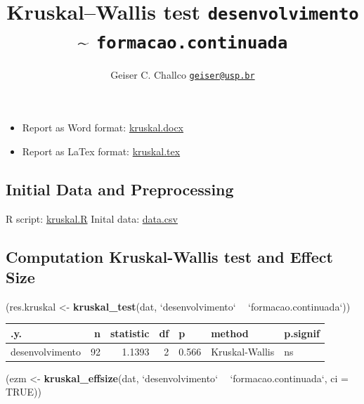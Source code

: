 \documentclass[]{article}
\title{Kruskal--Wallis test \texttt{desenvolvimento} \textasciitilde{}
\texttt{formacao.continuada}}
\author{Geiser C. Challco \href{mailto:geiser@usp.br}{\nolinkurl{geiser@usp.br}}}
\date{}
\newenvironment{Shaded}{\begin{snugshade}}{\end{snugshade}}
\newcommand{\DataTypeTok}[1]{\textcolor[rgb]{0.13,0.29,0.53}{#1}}
\newcommand{\KeywordTok}[1]{\textcolor[rgb]{0.13,0.29,0.53}{\textbf{#1}}}
\newcommand{\NormalTok}[1]{#1}
\newcommand{\OperatorTok}[1]{\textcolor[rgb]{0.81,0.36,0.00}{\textbf{#1}}}
\newcommand{\OtherTok}[1]{\textcolor[rgb]{0.56,0.35,0.01}{#1}}
\newcommand{\StringTok}[1]{\textcolor[rgb]{0.31,0.60,0.02}{#1}}
\providecommand{\tightlist}{%
  \setlength{\itemsep}{0pt}\setlength{\parskip}{0pt}}
\begin{document}
\maketitle

\begin{itemize}
\tightlist
\item
  Report as Word format: \url{kruskal.docx}
\item
  Report as LaTex format: \url{kruskal.tex}
\end{itemize}

\hypertarget{initial-data-and-preprocessing}{%
\subsection{Initial Data and
Preprocessing}\label{initial-data-and-preprocessing}}

R script: \url{kruskal.R} Inital data: \url{data.csv}

\hypertarget{computation-kruskal-wallis-test-and-effect-size}{%
\subsection{Computation Kruskal-Wallis test and Effect
Size}\label{computation-kruskal-wallis-test-and-effect-size}}

\begin{Shaded}
\begin{Highlighting}[]
\NormalTok{(res.kruskal <-}\StringTok{ }\KeywordTok{kruskal_test}\NormalTok{(dat, }\StringTok{`}\DataTypeTok{desenvolvimento}\StringTok{`} \OperatorTok{~}\StringTok{ `}\DataTypeTok{formacao.continuada}\StringTok{`}\NormalTok{))}
\end{Highlighting}
\end{Shaded}

\begin{longtable}[]{@{}lrrrlll@{}}
\toprule
.y. & n & statistic & df & p & method & p.signif\tabularnewline
\midrule
\endhead
desenvolvimento & 92 & 1.1393 & 2 & 0.566 & Kruskal-Wallis &
ns\tabularnewline
\bottomrule
\end{longtable}

\begin{Shaded}
\begin{Highlighting}[]
\NormalTok{(ezm <-}\StringTok{ }\KeywordTok{kruskal_effsize}\NormalTok{(dat, }\StringTok{`}\DataTypeTok{desenvolvimento}\StringTok{`} \OperatorTok{~}\StringTok{ `}\DataTypeTok{formacao.continuada}\StringTok{`}\NormalTok{, }\DataTypeTok{ci =} \OtherTok{TRUE}\NormalTok{))}
\end{Highlighting}
\end{Shaded}
\end{document}
